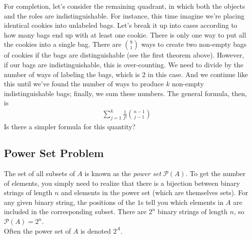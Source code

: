 For completion, let's consider the remaining quadrant, in which both the objects and the roles are indistinguishable. For instance, this time imagine we're placing identical cookies into unlabeled bags. Let's break it up into cases according to how many bags end up with at least one cookie. There is only one way to put all the cookies into a single bag. There are $\binom{9}{1}$ ways to create two non-empty bags of cookies if the bags are distinguishable (see the first theorem above). However, if our bags are indistinguishable, this is over-counting. We need to divide by the number of ways of labeling the bags, which is $2$ in this case. And we continue like this until we've found the number of ways to produce $k$ non-empty indistinguishable bags; finally, we sum these numbers. The general formula, then, is
\begin{align*}
\sum_{j=1}^k \frac{1}{j!} \binom{n-1}{j-1}
\end{align*}
Is there a simpler formula for this quantity?

\subsection{Power Set Problem}
The set of all subsets of $A$ is known as the \emph{power set} $\mathcal{P}(A)$. To get the number of elements, you simply need to realize that there is a bijection between binary strings of length $n$ and elements in the power set (which are themselves sets). For any given binary string, the positions of the $1$s tell you which elements in $A$ are included in the corresponding subset. There are $2^n$ binary strings of length $n$, so $\mathcal{P}(A) = 2^n$.\\

Often the power set of $A$ is denoted $2^A$.




